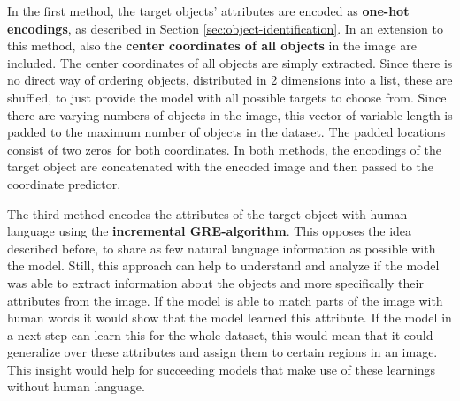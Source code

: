 In the first method, the target objects' attributes are encoded as \textbf{one-hot encodings}, as described in Section \ref{sec:object-identification}.
In an extension to this method, also the \textbf{center coordinates of all objects} in the image are included.
The center coordinates of all objects are simply extracted.
Since there is no direct way of ordering objects, distributed in 2 dimensions into a list, these are shuffled, to just provide the model with all possible targets to choose from.
Since there are varying numbers of objects in the image, this vector of variable length is padded to the maximum number of objects in the dataset.
The padded locations consist of two zeros for both coordinates.
In both methods, the encodings of the target object are concatenated with the encoded image and then passed to the coordinate predictor.

The third method encodes the attributes of the target object with human language using the \textbf{incremental GRE-algorithm}.
This opposes the idea described before, to share as few natural language information as possible with the model.
Still, this approach can help to understand and analyze if the model was able to extract information about the objects and more specifically their attributes from the image.
If the model is able to match parts of the image with human words it would show that the model learned this attribute.
If the model in a next step can learn this for the whole dataset, this would mean that it could generalize over these attributes and assign them to certain regions in an image.
This insight would help for succeeding models that make use of these learnings without human language.

